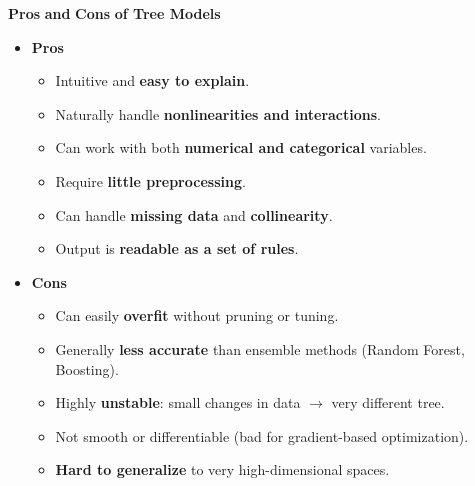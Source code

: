 \highspace
\begin{flushleft}
    \textcolor{Green3}{ \textbf{Pros}} \textbf{and} \textcolor{Red2}{ \textbf{Cons}} \textbf{of Tree Models}
\end{flushleft}
\begin{itemize}
    \item[\textcolor{Green3}{\faIcon{check-circle}}] \textcolor{Green3}{\textbf{Pros}}
    \begin{itemize}[label=\textcolor{Green3}{}]
        \item Intuitive and \textbf{easy to explain}.
        \item Naturally handle \textbf{nonlinearities and interactions}.
        \item Can work with both \textbf{numerical and categorical} variables.
        \item Require \textbf{little preprocessing}.
        \item Can handle \textbf{missing data} and \textbf{collinearity}.
        \item Output is \textbf{readable as a set of rules}.
    \end{itemize}
    \item[\textcolor{Red2}{\faIcon{times-circle}}] \textcolor{Red2}{\textbf{Cons}}
    \begin{itemize}[label=\textcolor{Red2}{}]
        \item Can easily \textbf{overfit} without pruning or tuning.
        \item Generally \textbf{less accurate} than ensemble methods (Random Forest, Boosting).
        \item Highly \textbf{unstable}: small changes in data $\rightarrow$ very different tree.
        \item Not smooth or differentiable (bad for gradient-based optimization).
        \item \textbf{Hard to generalize} to very high-dimensional spaces.
    \end{itemize}
\end{itemize}

